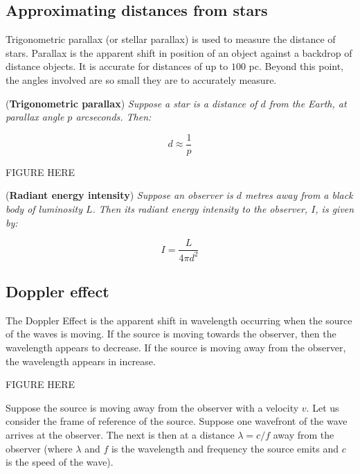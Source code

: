 \subsection{Approximating distances from stars}

Trigonometric parallax (or stellar parallax) is used to measure the distance of stars. Parallax is the apparent shift in position of an object against a backdrop of distance objects. It is accurate for distances of up to $100$ pc. Beyond this point, the angles involved are so small they are to accurately measure. 

\begin{theorem}{(\textbf{Trigonometric parallax})}
\textit{Suppose a star is a distance of $d$ from the Earth, at parallax angle $p$ arcseconds. Then: }

\begin{equation} 
d \approx \frac 1 p
\end{equation} 

FIGURE HERE

\end{theorem}

\begin{theorem}{(\textbf{Radiant energy intensity})}
\textit{Suppose an observer is \(d\) metres away from a black body of luminosity \(L\). Then its radiant energy intensity to the observer, \(I\), is given by: }

\begin{equation} 
I = \frac L {4 \pi d^2}
\end{equation} 

\end{theorem} 
\subsection{Doppler effect} 

The Doppler Effect is the apparent shift in wavelength occurring when the source of the waves is moving. If the source is moving towards the observer, then the wavelength appears to decrease. If the source is moving away from the observer, the wavelength appears in increase. 

FIGURE HERE

Suppose the source is moving away from the observer with a velocity $v$. Let us consider the frame of reference of the source. Suppose one wavefront of the wave arrives at the observer. The next is then at a distance $\lambda = c/f$ away from the observer (where $\lambda$ and $f$ is the wavelength and frequency the source emits and $c$ is the speed of the wave). 

